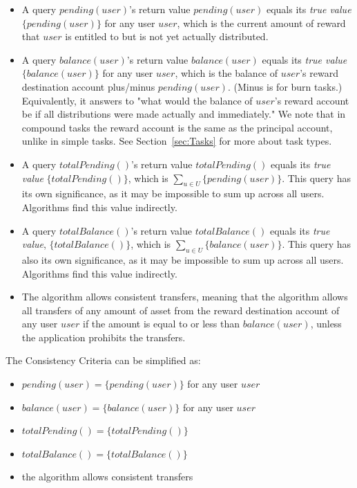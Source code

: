 \documentclass{article}
\begin{document}
\begin{itemize}
  \item A query $pending(user)$'s return value $pending(user)$ equals 
  its \textit{true value} $\{pending(user)\}$ for any user $user$,
  which is the current amount of reward that $user$ is entitled to 
  but is not yet actually distributed.

  \item A query $balance(user)$'s return value $balance(user)$ equals 
  its \textit{true value} $\{balance(user)\}$ for any user $user$,
  which is the balance of $user$'s reward destination account 
  plus/minus $pending(user)$. (Minus is for burn tasks.)
  Equivalently, it answers to "what would the balance of $user$'s 
  reward account be if all distributions were made actually and immediately."
  We note that in compound tasks the reward account is the same as the principal 
  account, unlike in simple tasks. 
  See Section~\ref{sec:Tasks} for more about task types.
  
  \item A query $totalPending()$'s return value $totalPending()$ equals 
  its \textit{true value} $\{totalPending()\}$,
  which is $\sum_{u \in U} \{pending(user)\}$.
  This query has its own significance, as it may be impossible to sum up across all users.
  Algorithms find this value indirectly.

  \item A query $totalBalance()$'s return value $totalBalance()$ equals 
  its \textit{true value}, $\{totalBalance()\}$,
  which is $\sum_{u \in U}\{balance(user)\}$.
  This query has also its own significance, as it may be impossible to sum up across 
  all users. Algorithms find this value indirectly.

  \item The algorithm allows consistent transfers,
  meaning that the algorithm allows all transfers of any amount of asset  
  from the reward destination account of any user $user$ if the amount is equal to or 
  less than $balance(user)$, unless the application prohibits the transfers.

\end{itemize}

The Consistency Criteria can be simplified as:
\begin{itemize}
  \item $pending(user) = \{pending(user)\}$ for any user $user$
  \item $balance(user) = \{balance(user)\}$ for any user $user$
  \item $totalPending() = \{totalPending()\}$
  \item $totalBalance() = \{totalBalance()\}$
  \item the algorithm allows consistent transfers
\end{itemize}
\end{document}
